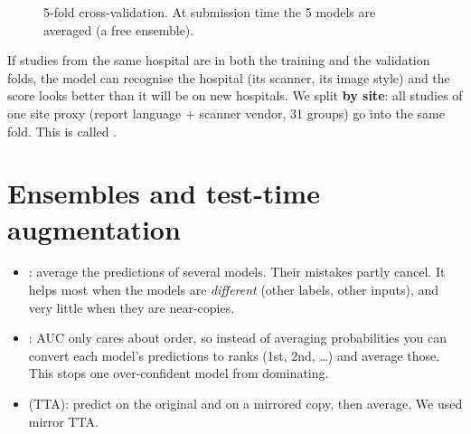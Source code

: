\begin{figure}[H]
\centering
{}
\caption{5-fold cross-validation. At submission time the 5 models are averaged (a free ensemble).}
\label{fig:kfold}
\end{figure}

\begin{watchout}
If studies from the same hospital are in both the training and the validation folds, the model can recognise the
hospital (its scanner, its image style) and the score looks better than it will be on new hospitals. We split
\textbf{by site}: all studies of one site proxy (report language + scanner vendor, 31 groups) go into the same
fold. This is called .
\end{watchout}

\section{Ensembles and test-time augmentation}

\begin{itemize}
\item {}: average the predictions of several models. Their mistakes partly cancel. It helps most when
      the models are \emph{different} (other labels, other inputs), and very little when they are near-copies.
\item {}: AUC only cares about order, so instead of averaging probabilities you can convert each
      model's predictions to ranks (1st, 2nd, \ldots) and average those. This stops one over-confident model from
      dominating.
\item {} (TTA): predict on the original and on a mirrored copy, then average. We used
      mirror TTA.
\end{itemize}

